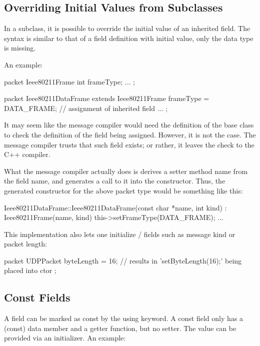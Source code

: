 \subsection{Overriding Initial Values from Subclasses}
\label{sec:msg-defs:assignment-of-inherited-fields}

In a subclass, it is possible to override the initial value of an inherited
field. The syntax is similar to that of a field definition with initial value,
only the data type is missing.

An example:

\begin{msg}
packet Ieee80211Frame
{
    int frameType;
    ...
};

packet Ieee80211DataFrame extends Ieee80211Frame
{
    frameType = DATA_FRAME;  // assignment of inherited field
    ...
};
\end{msg}

It may seem like the message compiler would need the definition of the base
class to check the definition of the field being assigned. However, it is
not the case. The message compiler trusts that such field exists; or
rather, it leaves the check to the C++ compiler.

What the message compiler actually does is derives a setter method name
from the field name, and generates a call to it into the constructor.
Thus, the generated constructor for the above packet type would be
something like this:

\begin{cpp}
Ieee80211DataFrame::Ieee80211DataFrame(const char *name, int kind) :
    Ieee80211Frame(name, kind)
{
    this->setFrameType(DATA_FRAME);
    ...
}
\end{cpp}

This implementation also lets one initialize  /
 fields such as message kind or packet length:

\begin{msg}
packet UDPPacket
{
    byteLength = 16;  // results in 'setByteLength(16);' being placed into ctor
};
\end{msg}


\subsection{Const Fields}
\label{sec:msg-defs:const-fields}

A field can be marked as const by the using  keyword. A
const field only has a (const) data member and a getter function, but no
setter. The value can be provided via an initializer. An example:

